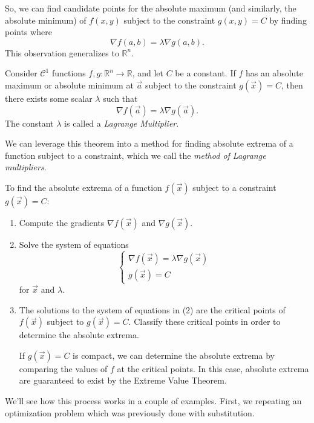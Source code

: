 \documentclass{ximera}
\begin{document}
So, we can find candidate points for the absolute maximum (and similarly, the absolute minimum) of $f(x,y)$ subject to the constraint $g(x,y)=C$ by finding points where
\[
\nabla f(a,b) = \lambda \nabla g(a,b).
\]
This observation generalizes to $\mathbb{R}^n$.

\begin{proposition}
Consider $\mathcal{C}^1$ functions $f,g:\mathbb{R}^n\rightarrow\mathbb{R}$, and let $C$ be a constant. If $f$ has an absolute maximum or absolute minimum at $\vec{a}$ subject to the constraint $g(\vec{x}) = C$, then there exists some scalar $\lambda$ such that
\[
\nabla f(\vec{a}) = \lambda \nabla g(\vec{a}).
\]
The constant $\lambda$ is called a \emph{Lagrange Multiplier}.
\end{proposition}

We can leverage this theorem into a method for finding absolute extrema of a function subject to a constraint, which we call the \emph{method of Lagrange multipliers}.

To find the absolute extrema of a function $f(\vec{x})$ subject to a constraint $g(\vec{x})=C$:
\begin{enumerate}
\item Compute the gradients $\nabla f(\vec{x})$ and $\nabla g(\vec{x})$.
\item Solve the system of equations
\[\begin{cases}
\nabla f(\vec{x}) = \lambda \nabla g(\vec{x})\\
g(\vec{x}) = C
\end{cases}\]
for $\vec{x}$ and $\lambda$. 
\item The solutions to the system of equations in (2) are the critical points of $f(\vec{x})$ subject to $g(\vec{x}) = C$. Classify these critical points in order to determine the absolute extrema.

If $g(\vec{x})=C$ is compact, we can determine the absolute extrema by comparing the values of $f$ at the critical points. In this case, absolute extrema are guaranteed to exist by the Extreme Value Theorem.
\end{enumerate}

We'll see how this process works in a couple of examples. First, we repeating an optimization problem which was previously done with substitution.
\end{document}
